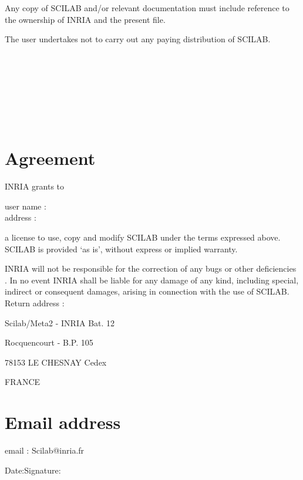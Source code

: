 Any copy of SCILAB and/or relevant documentation must include reference to the
ownership of INRIA and the present file.

The user undertakes not to carry out any paying distribution of SCILAB.

\ 

\ 

\ 

\ 


\section{Agreement}
INRIA grants to

\noindent
user name :\\
address	 :\\

\vspace{1.5cm}

\noindent
a license to use, copy  and modify SCILAB under the terms expressed
above. SCILAB is provided `as is', without express or implied warranty.


INRIA will not be responsible for the correction of any bugs or other 
deficiencies . In no event INRIA shall be liable for any damage of any 
kind, including special, indirect or consequent damages, arising in 
connection with the use of SCILAB.\\

\vskip0.6cm
\noindent
Return address :

Scilab/Meta2 - INRIA Bat. 12

Rocquencourt - B.P. 105

78153 LE CHESNAY Cedex

FRANCE

\section{Email address}
email : Scilab@inria.fr

\vskip0.4cm
\noindent
Date:\qquad \qquad \qquad \qquad \qquad \qquad \qquad Signature:

